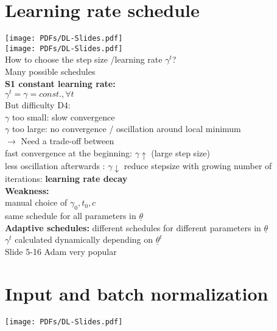 \section{Learning rate schedule}
\texttt{[image: PDFs/DL-Slides.pdf]}\\
\texttt{[image: PDFs/DL-Slides.pdf]}\\
How to choose the step size /learning rate $  \gamma^t $?\\
Many possible schedules \\
\textbf{S1 constant learning rate:}\\
$ \gamma^t = \gamma = const., \forall t $\\
But difficulty D4: \\
\textbullet $  \gamma $ too small: slow convergence \\
\textbullet $  \gamma $ too large: no convergence / oscillation around local minimum\\
$\rightarrow$ Need a trade-off between \\
\textbullet fast convergence at the beginning: $  \gamma \uparrow $ (large step size) \\
\textbullet less oscillation afterwards : $  \gamma \downarrow $ reduce stepsize with growing number of iterations: \textbf{learning rate decay} \\
\textbf{Weakness:}\\
\textbullet manual choice of $ \gamma_0, t_0 , c $\\
\textbullet same schedule for all parameters in $ \underline{\theta} $ \\
\textbf{Adaptive schedules:}
\textbullet different schedules for different parameters in $  \underline{\theta} $\\
\textbullet $ \gamma^t  $ calculated dynamically depending on $ \underline{\theta}^t $ \\
Slide 5-16 Adam very popular 
\section{Input and batch normalization}
\texttt{[image: PDFs/DL-Slides.pdf]}

